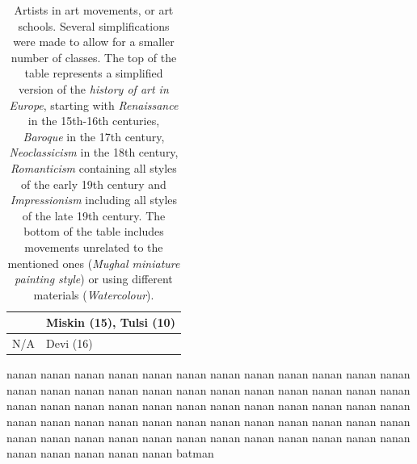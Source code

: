 \documentclass[11pt,a4paper,draft]{report}
\begin{document}
\begin{multicols}{2}
\begin{table}[htp]
\begin{tabular}{|l|l|}
                     &  Miskin (15), Tulsi (10)                         \\
\midrule
N/A                  &  Devi (16) \\
\bottomrule
\end{tabular}
\caption[Artists in art movements]{Artists in art movements, or art schools.
Several simplifications were made to allow for a smaller number of classes.
The top of the table represents a simplified version of the \emph{history of
art in Europe}, starting with \emph{Renaissance} in the 15th-16th centuries,
\emph{Baroque} in the 17th century, \emph{Neoclassicism} in the 18th century,
\emph{Romanticism} containing all styles of the early 19th century and
\emph{Impressionism} including all styles of the late 19th century.  The bottom
of the table includes movements unrelated to the mentioned ones (\emph{Mughal
miniature painting style}) or using different materials (\emph{Watercolour}).}
\label{tab:style}
\end{table}

nanan nanan nanan nanan nanan nanan nanan nanan nanan nanan nanan nanan nanan
nanan nanan nanan nanan nanan nanan nanan nanan nanan nanan nanan nanan nanan
nanan nanan nanan nanan nanan nanan nanan nanan nanan nanan nanan nanan nanan
nanan nanan nanan nanan nanan nanan nanan nanan nanan nanan nanan nanan nanan
nanan nanan nanan nanan nanan nanan nanan nanan nanan nanan nanan nanan nanan
batman

%
%
%
%
%
%


%



\end{multicols}
\end{document}
